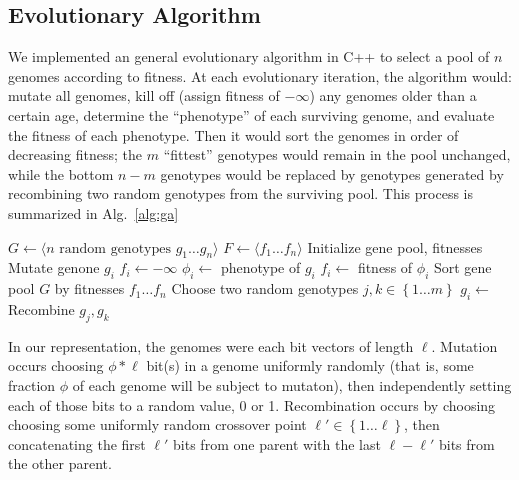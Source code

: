 \documentclass[twocolumn]{article}
\newcommand{\set}[1]{\left\{#1\right\}}
\newcommand{\seq}[1]{\langle #1 \rangle}
\newcommand{\alg}[1]{Alg.~#1}
\begin{document}
\subsection{Evolutionary Algorithm}
We implemented an general evolutionary algorithm in C++ to select a pool of $n$ genomes according to fitness.  At each evolutionary iteration, the algorithm would: mutate all genomes, kill off (assign fitness of $-\infty$) any genomes older than a certain age, determine the ``phenotype'' of each surviving genome, and evaluate the fitness of each phenotype. Then it would sort the genomes in order of decreasing fitness; the $m$ ``fittest'' genotypes would remain in the pool unchanged, while the bottom $n-m$ genotypes would be replaced by genotypes generated by recombining two random genotypes from the surviving pool. This process is summarized in \alg{\ref{alg:ga}}

\begin{algorithm}
\label{alg:ga}
\begin{algorithmic}[1]
	\State $G \gets \seq{\text{$n$ random genotypes $g_1 \ldots g_n$}}$
	\State $F \gets \seq{f_1 \ldots f_n}$
	\Statex \Comment Initialize gene pool, fitnesses
	\Repeat
		\ForAll{$i \in \set{1 \ldots n}$}
			\State Mutate genone $g_i$
				\State $f_i \gets -\infty$
			\Else
				\State $\phi_i \gets$ phenotype of $g_i$
				\State $f_i \gets$ fitness of $\phi_i$
			\EndIf
		\EndFor
		\State Sort gene pool $G$ by fitnesses $f_1 \ldots f_n$
		\ForAll{$i \in \set{m \ldots n}$}
			\State Choose two random genotypes 
			\State $j,k \in \set{1 \ldots m}$
			\State $g_i \gets$ Recombine $g_j, g_k$
		\EndFor
	\EndProcedure
\end{algorithmic}
\end{algorithm}

In our representation, the genomes were each bit vectors of length $\ell$. Mutation occurs choosing $\phi*\ell$ bit(s) in a genome uniformly randomly (that is, some fraction $\phi$ of each genome will be subject to mutaton), then independently setting each of those bits to a random value, 0 or 1. Recombination occurs by choosing choosing some uniformly random crossover point $\ell' \in \set{1\ldots\ell}$, then concatenating the first $\ell'$ bits from one parent with the last $\ell-\ell'$ bits from the other parent.  
\end{document}
